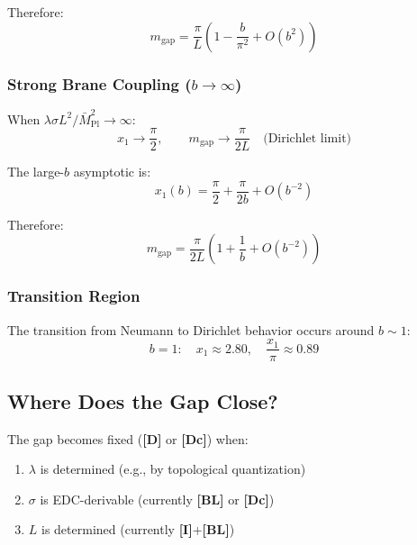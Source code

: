 \documentclass[11pt,a4paper]{article}
\newcommand{\Mpl}{\bar{M}_{\mathrm{Pl}}}
\newcommand{\mgap}{m_{\mathrm{gap}}}
\newcommand{\tagD}{\textbf{[D]}}
\newcommand{\tagDc}{\textbf{[Dc]}}
\newcommand{\tagI}{\textbf{[I]}}
\newcommand{\tagBL}{\textbf{[BL]}}
\theoremstyle{definition}
\theoremstyle{plain}
\theoremstyle{remark}
\begin{document}
Therefore:
\begin{equation}
\mgap = \frac{\pi}{L}\left(1 - \frac{b}{\pi^2} + O(b^2)\right)
\label{eq:gap-small-b}
\end{equation}

\subsubsection{Strong Brane Coupling ($b \to \infty$)}

When $\lambda\sigma L^2/\Mpl^2 \to \infty$:
\begin{equation}
x_1 \to \frac{\pi}{2}, \qquad \mgap \to \frac{\pi}{2L} \quad \text{(Dirichlet limit)}
\label{eq:dirichlet-limit}
\end{equation}

The large-$b$ asymptotic is:
\begin{equation}
x_1(b) = \frac{\pi}{2} + \frac{\pi}{2b} + O(b^{-2})
\label{eq:large-b-expansion}
\end{equation}

Therefore:
\begin{equation}
\mgap = \frac{\pi}{2L}\left(1 + \frac{1}{b} + O(b^{-2})\right)
\label{eq:gap-large-b}
\end{equation}

\subsubsection{Transition Region}

The transition from Neumann to Dirichlet behavior occurs around $b \sim 1$:
\begin{equation}
b = 1: \quad x_1 \approx 2.80, \quad \frac{x_1}{\pi} \approx 0.89
\label{eq:transition-b1}
\end{equation}

\subsection{Where Does the Gap Close?}

The gap becomes fixed (\tagD{} or \tagDc{}) when:
\begin{enumerate}
\item $\lambda$ is determined (e.g., by topological quantization)
\item $\sigma$ is EDC-derivable (currently \tagBL{} or \tagDc{})
\item $L$ is determined (currently \tagI{}+\tagBL{})
\end{enumerate}
\end{document}
